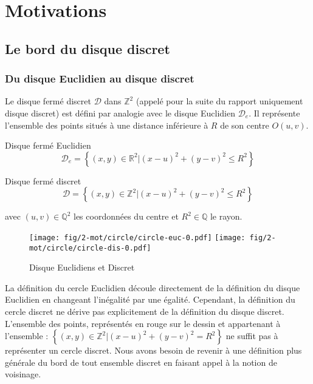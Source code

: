 \section{Motivations}

\subsection{Le bord du disque discret}

\subsubsection{Du disque Euclidien au disque discret}


Le  disque fermé discret $\mathcal{D}$ dans $\mathbb{Z}^{2}$ (appelé pour la suite du rapport uniquement disque discret) est défini par analogie avec le disque Euclidien $\mathcal{D}_e$. Il représente l'ensemble des points situés à une distance inférieure à $R$ de son centre $O(u,v)$.


\begin{Definition}{Disque fermé Euclidien}
\label{def:disk-euc}
 $$\mathcal{D}_e =  \left\{ (x,y) \in \mathbb{R}^{2} |  (x - u)^2 + (y - v)^2 \leq R^2 \right\}$$
\end{Definition}

\begin{Definition}{Disque fermé discret}
\label{def:disk-dis}
  $$\mathcal{D} =  \left\{ (x,y) \in \mathbb{Z}^{2} |  (x - u)^2 + (y - v)^2 \leq R^2 \right\}$$
  
  avec $(u,v) \in \mathbb{Q}^{2}$ les coordonnées du centre et $R^2 \in \mathbb{Q}$ le rayon.\\
\end{Definition}

\begin{figure}[H]
  \centering
  \texttt{[image: fig/2-mot/circle/circle-euc-0.pdf]}
  \texttt{[image: fig/2-mot/circle/circle-dis-0.pdf]}
  \caption{Disque Euclidiens et Discret}
\end{figure}

La définition du cercle Euclidien découle directement de la définition du disque Euclidien en changeant l'inégalité par une égalité. Cependant, la définition du cercle discret ne dérive pas explicitement de la définition du disque discret. L'ensemble des points, représentés en rouge sur le dessin et appartenant à l'ensemble : $\left\{ (x,y) \in \mathbb{Z}^{2} |  (x - u)^2 + (y - v)^2 = R^2 \right\}$ ne suffit pas à représenter un cercle discret. Nous avons besoin de revenir à une définition plus générale du bord de tout ensemble discret en faisant appel à la notion de voisinage.\\

